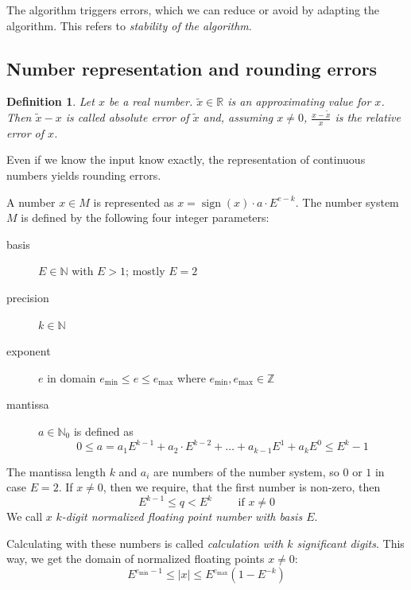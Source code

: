 \documentclass[a4paper]{article}
\newcounter{lecref}[section]
\numberwithin{lecref}{section}
\theoremstyle{break}
\newtheorem{definition}[lecref]{Definition}
\newcommand{\Abs}[1]{\left|#1\right|}
\DeclareMathOperator{\sign}{sign}
\begin{document}
The algorithm triggers errors, which we can reduce or avoid by adapting the algorithm.
This refers to \emph{stability of the algorithm}.

\subsection{Number representation and rounding errors}

\begin{definition}
  Let $x$ be a real number. $\tilde x \in \mathbb R$ is an approximating value for $x$.
  Then $\tilde x - x$ is called \emph{absolute error} of $\tilde x$ and, assuming $x \neq 0$, $\frac{x - \tilde x}{x}$ is the \emph{relative error of $x$}.
\end{definition}

Even if we know the input know exactly, the representation of continuous numbers yields rounding errors.

A number $x \in M$ is represented as $x = \sign(x) \cdot a \cdot E^{e - k}$.
The number system $M$ is defined by the following four integer parameters:
\begin{description}
  \item[basis] $E \in \mathbb N$ with $E > 1$; mostly $E = 2$
  \item[precision] $k \in \mathbb N$
  \item[exponent] $e$ in domain $e_{\min} \leq e \leq e_{\max}$ where $e_{\min}, e_{\max} \in \mathbb Z$
  \item[mantissa] $a \in \mathbb N_0$ is defined as
    \[ 0 \leq a = a_1 E^{k-1} + a_2 \cdot E^{k-2} + \dots + a_{k-1} E^1 + a_k E^0 \leq E^k - 1 \]
\end{description}

The mantissa length $k$ and $a_i$ are numbers of the number system, so $0$ or $1$ in case $E = 2$.
If $x \neq 0$, then we require, that the first number is non-zero, then
\[ E^{k-1} \leq q < E^k \qquad \text{ if } x \neq 0 \]
We call $x$ \emph{$k$-digit normalized floating point number with basis $E$}.

Calculating with these numbers is called \emph{calculation with $k$ significant digits}.
This way, we get the domain of normalized floating points $x \neq 0$:
\[ E^{e_{\min} - 1} \leq \Abs{x} \leq E^{e_{\max}} (1 - E^{-k}) \]
\end{document}
